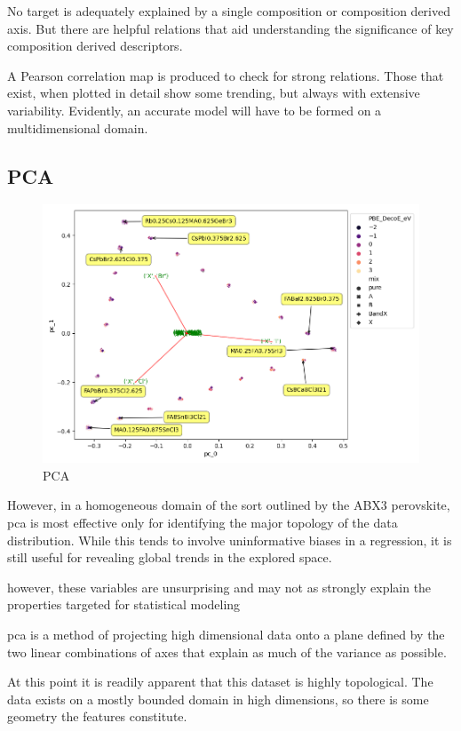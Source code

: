 \documentclass[twoside, twocolumn, 9pt, draft]{article}
\begin{document}
No target is adequately explained by a single composition or
composition derived axis. But there are helpful relations that aid
understanding the significance of key composition derived descriptors.

A Pearson correlation map is produced to check for strong
relations. Those that exist, when plotted in detail show some
trending, but always with extensive variability. Evidently, an
accurate model will have to be formed on a multidimensional domain.

\subsection*{PCA}
\label{sec:orgc2c6472}
\begin{figure}
\centering
\includegraphics[width=.9\linewidth]{./multivar/comp_ratio_projection_annot.png}
\caption{\label{fig:pca} PCA}
\end{figure}


However, in a homogeneous domain of the sort outlined by the ABX3
perovskite, pca is most effective only for identifying the major
topology of the data distribution. While this tends to involve
uninformative biases in a regression, it is still useful for revealing
global trends in the explored space.

 however, these variables are unsurprising
and may not as strongly explain the properties targeted for
statistical modeling


\acrshort{pca} is a method of projecting high dimensional data onto
a plane defined by the two linear combinations of axes that explain as
much of the variance as possible.


At this point it is readily apparent that this dataset is highly
topological. The data exists on a mostly bounded domain in high
dimensions, so there is some geometry the features constitute.
\end{document}
